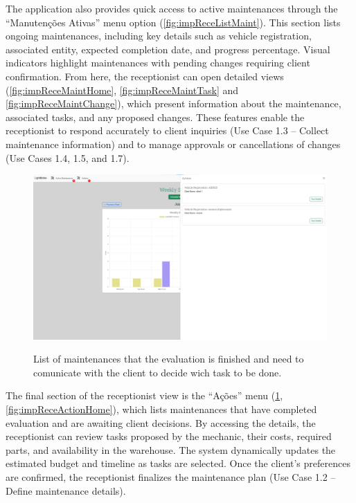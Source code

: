 The application also provides quick access to active maintenances through the “Manutenções Ativas” menu option (\ref{fig:impReceListMaint}). This section lists ongoing maintenances, including key details such as vehicle registration, associated entity, expected completion date, and progress percentage. Visual indicators highlight maintenances with pending changes requiring client confirmation. From here, the receptionist can open detailed views (\ref{fig:impReceMaintHome}, \ref{fig:impReceMaintTask} and \ref{fig:impReceMaintChange}), which present information about the maintenance, associated tasks, and any proposed changes. These features enable the receptionist to respond accurately to client inquiries (Use Case 1.3 – Collect maintenance information) and to manage approvals or cancellations of changes (Use Cases 1.4, 1.5, and 1.7).


\begin{figure}[h]
  \caption{List of maintenances that the evaluation is finished and need to comunicate with the client to decide wich task to be done.}
  \centering
  \includegraphics[width=\textwidth]{figs/Implementation/rececionist/action_list}
  \label{fig:impReceListAction}
\end{figure}



The final section of the receptionist view is the “Ações” menu (\ref{fig:impReceListAction}, \ref{fig:impReceActionHome}), which lists maintenances that have completed evaluation and are awaiting client decisions. By accessing the details, the receptionist can review tasks proposed by the mechanic, their costs, required parts, and availability in the warehouse. The system dynamically updates the estimated budget and timeline as tasks are selected. Once the client's preferences are confirmed, the receptionist finalizes the maintenance plan (Use Case 1.2 – Define maintenance details).



